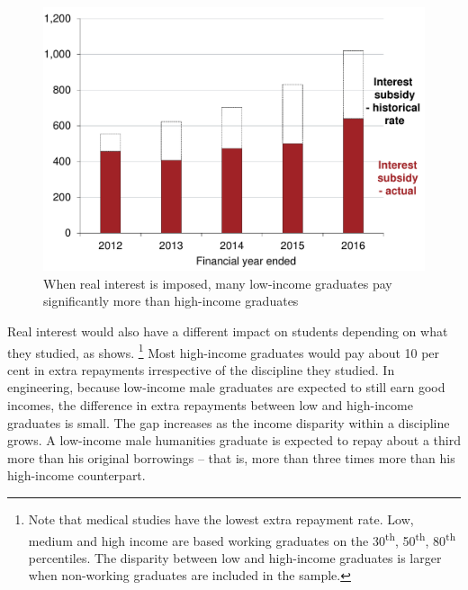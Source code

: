 \documentclass[embargoed]{grattan}
\begin{document}
{\begin{figure}
\caption{When real interest is imposed, many low-income graduates pay significantly more than high-income graduates}\label{fig:fig14-when-real-interest-imposed-many-low-income-grads-pay-signif-more-than-high-income-grads}


\includegraphics[page=14]{atlas/Chartpack.pdf}

%
\end{figure}

Real interest would also have a different impact on students depending on what they studied, as  shows.%
\footnote{Note that medical studies have the lowest extra repayment rate.
Low, medium and high income are based working graduates on the 30\textsuperscript{th}, 50\textsuperscript{th}, 80\textsuperscript{th} percentiles.
The disparity between low and high-income graduates is larger when non-working graduates are included in the sample.} Most high-income graduates would pay about 10 per cent in extra repayments irrespective of the discipline they studied.
In engineering, because low-income male graduates are expected to still earn good incomes, the difference in extra repayments between low and high-income graduates is small.
The gap increases as the income disparity within a discipline grows.
A low-income male humanities graduate is expected to repay about a third more than his original borrowings -- that is, more than three times more than his high-income counterpart.

}
\end{document}
